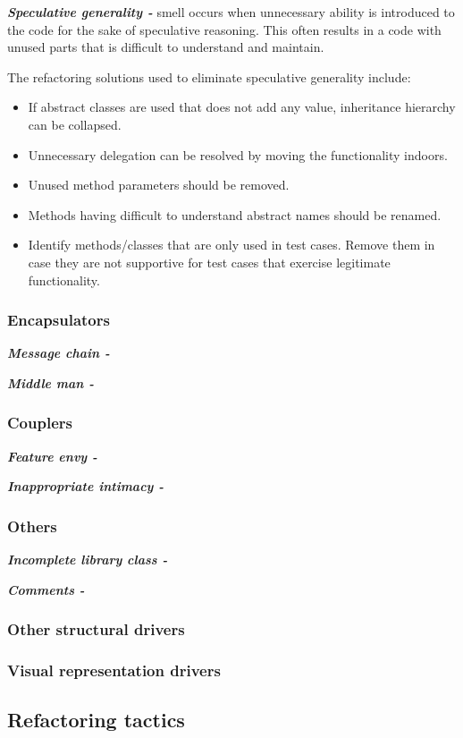 \textit{\textbf{Speculative generality -}} smell occurs when unnecessary ability is introduced to the code for the sake of speculative reasoning. This often results in a code with unused parts that is difficult to understand and maintain. 

The refactoring solutions used to eliminate speculative generality include:

\begin{itemize}
\item If abstract classes are used that does not add any value, inheritance hierarchy can be collapsed.
\item Unnecessary delegation can be resolved by moving the functionality indoors.
\item Unused method parameters should be removed.
\item Methods having difficult to understand abstract names should be renamed.
\item Identify methods/classes that are only used in test cases. Remove them in case they are not supportive for test cases that exercise legitimate functionality. 
\end{itemize}

\subsubsection*{Encapsulators}

\textit{\textbf{Message chain -}} 
 
\textit{\textbf{Middle man -}} 

\subsubsection*{Couplers}

\textit{\textbf{Feature envy -}} 
 
\textit{\textbf{Inappropriate intimacy -}} 

\subsubsection*{Others}

\textit{\textbf{Incomplete library class -}} 
 
\textit{\textbf{Comments -}} 

\subsubsection{Other structural drivers}

\subsubsection{Visual representation drivers}
 

\subsection{Refactoring tactics}